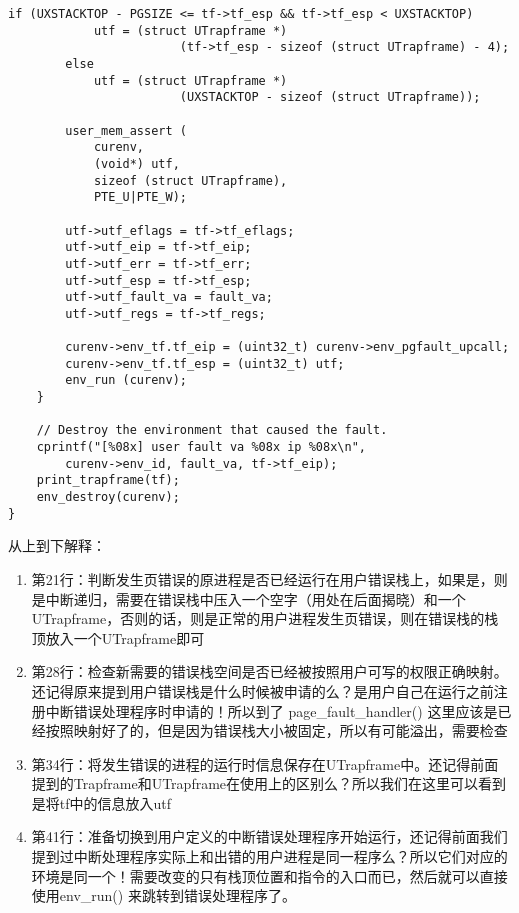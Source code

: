 \documentclass{article}
\newcommand{\funcname}[1]{{\ttfamily \small #1}}
\begin{document}
\begin{CJK*}{UTF8}{gkai}
\begin{lstlisting}[style=ccode, title={\scriptsize \ttfamily \bfseries kern/trap.c: page\_fault\_handler()}]
        if (UXSTACKTOP - PGSIZE <= tf->tf_esp && tf->tf_esp < UXSTACKTOP)
            utf = (struct UTrapframe *) 
                        (tf->tf_esp - sizeof (struct UTrapframe) - 4);
        else
            utf = (struct UTrapframe *) 
                        (UXSTACKTOP - sizeof (struct UTrapframe));

        user_mem_assert (
            curenv, 
            (void*) utf, 
            sizeof (struct UTrapframe), 
            PTE_U|PTE_W); 

        utf->utf_eflags = tf->tf_eflags;
        utf->utf_eip = tf->tf_eip;
        utf->utf_err = tf->tf_err;
        utf->utf_esp = tf->tf_esp;
        utf->utf_fault_va = fault_va;
        utf->utf_regs = tf->tf_regs;

        curenv->env_tf.tf_eip = (uint32_t) curenv->env_pgfault_upcall;
        curenv->env_tf.tf_esp = (uint32_t) utf;
        env_run (curenv);
    }

    // Destroy the environment that caused the fault.
    cprintf("[%08x] user fault va %08x ip %08x\n",
        curenv->env_id, fault_va, tf->tf_eip);
    print_trapframe(tf);
    env_destroy(curenv);
}
\end{lstlisting}

从上到下解释：

\begin{enumerate}
\item{第21行：判断发生页错误的原进程是否已经运行在用户错误栈上，如果是，则是中断递归，需要在错误栈中压入一个空字（用处在后面揭晓）和一个UTrapframe，否则的话，则是正常的用户进程发生页错误，则在错误栈的栈顶放入一个UTrapframe即可}
\item{第28行：检查新需要的错误栈空间是否已经被按照用户可写的权限正确映射。还记得原来提到用户错误栈是什么时候被申请的么？是用户自己在运行之前注册中断错误处理程序时申请的！所以到了 \funcname{ page\_fault\_handler() } 这里应该是已经按照映射好了的，但是因为错误栈大小被固定，所以有可能溢出，需要检查}
\item{第34行：将发生错误的进程的运行时信息保存在UTrapframe中。还记得前面提到的Trapframe和UTrapframe在使用上的区别么？所以我们在这里可以看到是将tf中的信息放入utf}
\item{第41行：准备切换到用户定义的中断错误处理程序开始运行，还记得前面我们提到过中断处理程序实际上和出错的用户进程是同一程序么？所以它们对应的环境是同一个！需要改变的只有栈顶位置和指令的入口而已，然后就可以直接使用\funcname{env\_run()} 来跳转到错误处理程序了。}
\end{enumerate}




\end{CJK*}
\end{document}
